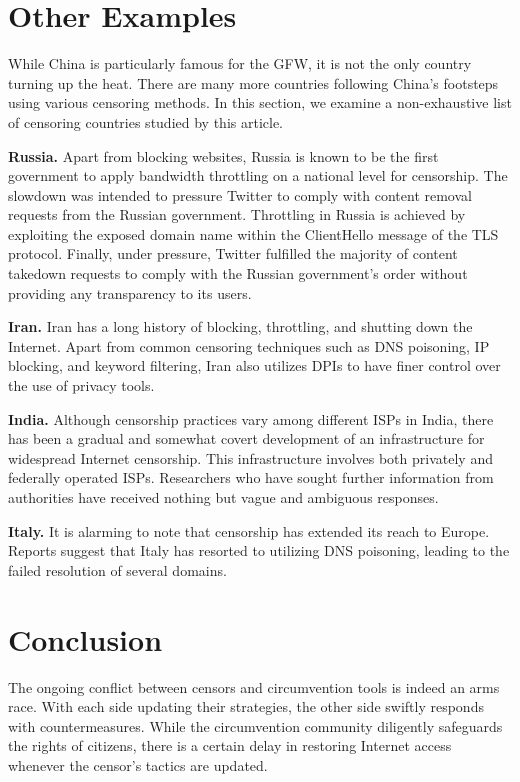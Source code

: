 \section{Other Examples}
While China is particularly famous for the GFW, it is not the only country turning up the heat. There are many more countries following China's footsteps using various censoring methods. In this section, we examine a non-exhaustive list of censoring countries studied by this article.

\textbf{Russia.} Apart from blocking websites, Russia is known to be the first government to apply bandwidth throttling on a national level for censorship. The slowdown was intended to pressure Twitter to comply with content removal requests from the Russian government. Throttling in Russia is achieved by exploiting the exposed domain name within the ClientHello message of the TLS protocol. Finally, under pressure, Twitter fulfilled the majority of content takedown requests to comply with the Russian government’s order without providing any transparency to its users.\cite{xue2021throttling}\cite{chai2019importance}

\textbf{Iran.} Iran has a long history of blocking, throttling, and shutting down the Internet. Apart from common censoring techniques such as DNS poisoning, IP blocking, and keyword filtering, Iran also utilizes DPIs to have finer control over the use of privacy tools.\cite{aryan2013iran}

\textbf{India.} Although censorship practices vary among different ISPs in India, there has been a gradual and somewhat covert development of an infrastructure for widespread Internet censorship. This infrastructure involves both privately and federally operated ISPs. Researchers who have sought further information from authorities have received nothing but vague and ambiguous responses.\cite{yadav2018light}

\textbf{Italy.} It is alarming to note that censorship has extended its reach to Europe. Reports suggest that Italy has resorted to utilizing DNS poisoning, leading to the failed resolution of several domains.\cite{aceto2017italy}

\section{Conclusion}
The ongoing conflict between censors and circumvention tools is indeed an arms race. With each side updating their strategies, the other side swiftly responds with countermeasures. While the circumvention community diligently safeguards the rights of citizens, there is a certain delay in restoring Internet access whenever the censor's tactics are updated.

